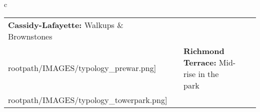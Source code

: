 \begin{table}[H]
        \begin{tabular}{c}
        \begin{tabular}{m{1.25in} m{2in} m{.1in} m{1.25in} m{2in}}
\textbf{Cassidy-Lafayette:} {Walkups \& Brownstones} & \texttt{[image: \\rootpath/IMAGES/typology\_prewar.png]} & & \textbf{Richmond Terrace:} {Mid-rise in the park} & \texttt{[image: \\rootpath/IMAGES/typology\_towerpark.png]}
\end{tabular}\end{tabular}
        \end{table}